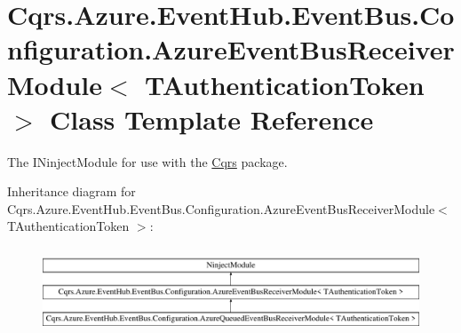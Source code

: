 \hypertarget{classCqrs_1_1Azure_1_1EventHub_1_1EventBus_1_1Configuration_1_1AzureEventBusReceiverModule}{}\section{Cqrs.\+Azure.\+Event\+Hub.\+Event\+Bus.\+Configuration.\+Azure\+Event\+Bus\+Receiver\+Module$<$ T\+Authentication\+Token $>$ Class Template Reference}
\label{classCqrs_1_1Azure_1_1EventHub_1_1EventBus_1_1Configuration_1_1AzureEventBusReceiverModule}


The I\+Ninject\+Module for use with the \hyperlink{namespaceCqrs}{Cqrs} package.  


Inheritance diagram for Cqrs.\+Azure.\+Event\+Hub.\+Event\+Bus.\+Configuration.\+Azure\+Event\+Bus\+Receiver\+Module$<$ T\+Authentication\+Token $>$\+:\begin{figure}[H]
\begin{center}
\leavevmode
\includegraphics[height=2.568807cm]{classCqrs_1_1Azure_1_1EventHub_1_1EventBus_1_1Configuration_1_1AzureEventBusReceiverModule}
\end{center}
\end{figure}
